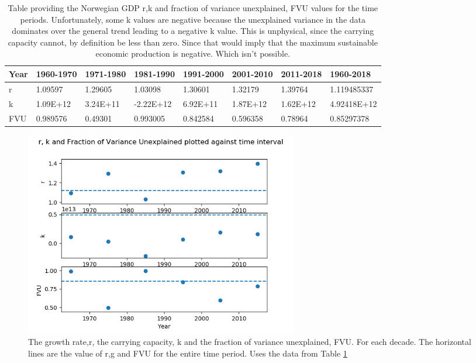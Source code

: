 \documentclass[11pt,a4paper]{CLabBookTemplate} %
\begin{document}
\begin{table}[h!]
	\begin{tabular}{|l|l|l|l|l|l|l|l|}
		\hline
		Year & 1960-1970 & 1971-1980 & 1981-1990 & 1991-2000 & 2001-2010 & 2011-2018 & 1960-2018   \\ \hline
		r    & 1.09597   & 1.29605   & 1.03098   & 1.30601   & 1.32179   & 1.39764   & 1.119485337 \\ \hline
		k    & 1.09E+12  & 3.24E+11  & -2.22E+12 & 6.92E+11  & 1.87E+12  & 1.62E+12  & 4.92418E+12 \\ \hline
		FVU  & 0.989576  & 0.49301   & 0.993005  & 0.842584  & 0.596358  & 0.78964   & 0.85297378  \\ \hline
	\end{tabular}
	\caption{Table providing the Norwegian GDP r,k and fraction of variance unexplained, FVU values for the time periods. Unfortunately, some k values are negative because the unexplained variance in the data dominates over the general trend leading to a negative k value. This is unphysical, since the carrying capacity cannot, by definition be less than zero. Since that would imply that the maximum sustainable economic production is negative. Which isn't possible.}
	\label{NorTable}
\end{table}
\clearpage

\begin{figure}[h!]
	\centering
	\includegraphics[width = 120mm]{Figures/RgkNOR.png}
	\caption{The growth rate,r, the carrying capacity, k and the fraction of variance unexplained, FVU. For each decade. The horizontal lines are the value of r,g and FVU for the entire time period. Uses the data from Table \ref{NorTable}}
	\label{fig:RgkNOR}
\end{figure}
\end{document}

